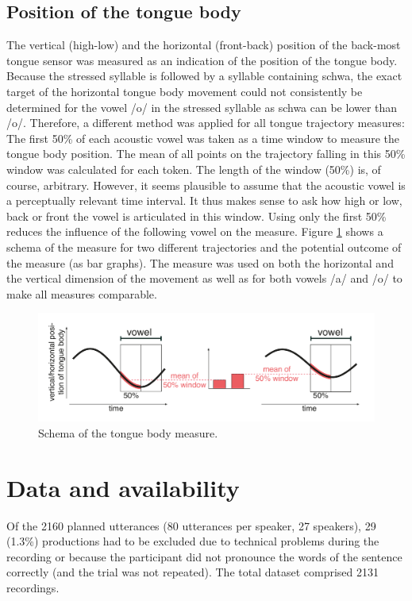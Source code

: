 \subsection{Position of the tongue body}

The vertical (high-low) and the horizontal (front-back) position of the back-most tongue sensor was measured as an indication of the position of the tongue body. Because the stressed syllable is followed by a syllable containing schwa, the exact target of the horizontal tongue body movement could not consistently be determined for the vowel /o/ in the stressed syllable as schwa can be lower than /o/. Therefore, a different method was applied for all tongue trajectory measures: The first 50\% of each acoustic vowel was taken as a time window to measure the tongue body position. The mean of all points on the trajectory falling in this 50\% window was calculated for each token. The length of the window (50\%) is, of course, arbitrary. However, it seems plausible to assume that the acoustic vowel is a perceptually relevant time interval. It thus makes sense to ask how high or low, back or front the vowel is articulated in this window. Using only the first 50\% reduces the influence of the following vowel on the measure. Figure \ref{fig:tounge_measure} shows a schema of the measure for two different trajectories and the potential outcome of the measure (as bar graphs). The measure was used on both the horizontal and the vertical dimension of the movement as well as for both vowels /a/ and /o/ to make all measures comparable.

\begin{figure}
\includegraphics[width=\textwidth]{figures/ch5/measures_tbo2.pdf}
\caption{Schema of the tongue body measure.}
\label{fig:tounge_measure}
\end{figure}

\section{Data and availability}

Of the 2160 planned utterances (80 utterances per speaker, 27 speakers), 29 (1.3\%) productions had to be excluded due to technical problems during the recording or because the participant did not pronounce the words of the sentence correctly (and the trial was not repeated). The total dataset comprised 2131 recordings. 

